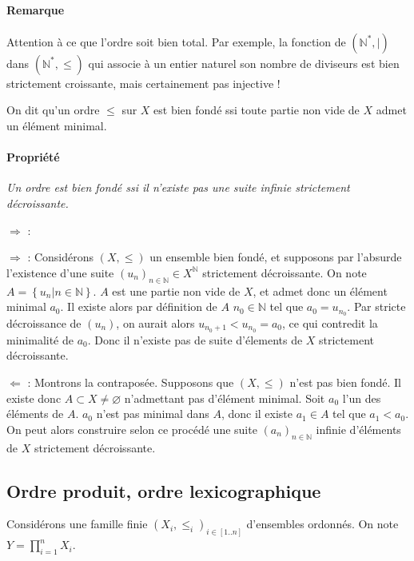 \documentclass{scrartcl}
\begin{document}
			\paragraph{Remarque} Attention à ce que l'ordre soit bien total. 
				Par exemple, la fonction de $(\mathbb{N}^*,|)$ dans $(\mathbb{N}^*,\leq)$ 
				qui associe à un entier naturel son nombre de diviseurs est bien strictement croissante,
				mais certainement pas injective !

			On dit qu'un ordre $\leq$ sur $X$ est bien fondé ssi toute partie non vide de $X$ admet
			un élément minimal.

			\paragraph{Propriété} \textsl{Un ordre est bien fondé ssi il n'existe pas une suite infinie strictement décroissante.}
			\begin{labeling}{$\Rightarrow$ :}
				\item [$\Rightarrow$ :] Considérons $(X,\leq)$ un ensemble bien fondé,
				et supposons par l'absurde l'existence d'une suite $(u_n)_{n\in\mathbb{N}}\in X^\mathbb{N}$ strictement décroissante.
				On note $A = \left\{u_n \big| n \in \mathbb{N}\right\}$.
				$A$ est une partie non vide de $X$, et admet donc un élément minimal $a_0$.
				Il existe alors par définition de $A$ $n_0\in\mathbb{N}$ tel que $a_0 = u_{n_0}$.
				Par stricte décroissance de $(u_n)$, on aurait alors  $u_{n_0+1} < u_{n_0} = a_0$, 
				ce qui contredit la minimalité de $a_0$. 
				Donc il n'existe pas de suite d'élements de $X$ strictement décroissante.
				\item [$\Leftarrow$ :] Montrons la contraposée. 
				Supposons que $(X,\leq)$ n'est pas bien fondé. 
				Il existe donc $A\subset X \neq \varnothing$ n'admettant pas d'élément minimal.
				Soit $a_0$ l'un des éléments de $A$. 
				$a_0$ n'est pas minimal dans $A$, donc il existe $a_1 \in A$ tel que $a_1 < a_0$.
				On peut alors construire selon ce procédé une suite $(a_n)_{n\in\mathbb{N}}$ infinie
				d'éléments de $X$ strictement décroissante.
			\end{labeling}
		\subsection{Ordre produit, ordre lexicographique}
			Considérons une famille finie $(X_i,\leq_i)_{i\in [1..n]}$ d'ensembles ordonnés.
			On note $Y = \prod_{i=1}^n X_i$.
			
\end{document}
